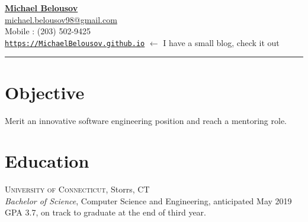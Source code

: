 \documentclass[Letterpaper,11pt]{article}
\begin{document}
\setlength{\parindent}{0em}
\setlength{\parskip}{1em}
\setlength{\parsep}{1em}
\setlength{\itemsep}{0.2em}
\setlength{\headsep}{0.2em}
\setlength{\topskip}{0.2em}
\setlength{\topmargin}{0.2em}
\setlength{\topsep}{0.2em}
\setlength{\partopsep}{0.2em}
\setlength{\columnsep}{1em}

\addtolength{\topmargin}{-4em}

\textbf{\href{mailto:michael.belousov98@gmail.com}{\Large Michael Belousov}}\\
\href{mailto:michael.belousov98@gmail.com}{michael.belousov98@gmail.com}\\
Mobile : (203) 502-9425\\
\href{https://MichaelBelousov.github.io/}{\texttt{https://MichaelBelousov.github.io}} $\gets$ I have a small blog, check it out\\
\hrule
\vspace{1em} %

\section*{Objective}

Merit an innovative software engineering position and reach a mentoring role.

\vspace{0.3em}


    \section*{Education}

        \textsc{University of Connecticut}, Storrs, CT\\
        \textit{Bachelor of Science}, Computer Science and Engineering, anticipated May 2019\\
        GPA 3.7, on track to graduate at the end of third year.
    
    
        
\end{document}
